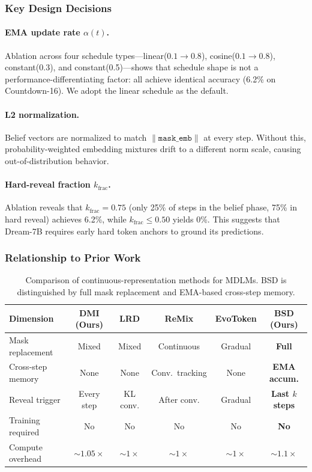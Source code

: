 \documentclass{article}
\begin{document}
\subsubsection{Key Design Decisions}

\paragraph{EMA update rate $\alpha(t)$.} Ablation across four schedule types---linear($0.1{\to}0.8$), cosine($0.1{\to}0.8$), constant(0.3), and constant(0.5)---shows that schedule shape is not a performance-differentiating factor: all achieve identical accuracy (6.2\% on Countdown-16). We adopt the linear schedule as the default.

\paragraph{L2 normalization.} Belief vectors are normalized to match $\|\texttt{mask\_emb}\|$ at every step. Without this, probability-weighted embedding mixtures drift to a different norm scale, causing out-of-distribution behavior.

\paragraph{Hard-reveal fraction $k_\text{frac}$.} Ablation reveals that $k_\text{frac} = 0.75$ (only 25\% of steps in the belief phase, 75\% in hard reveal) achieves 6.2\%, while $k_\text{frac} \leq 0.50$ yields 0\%. This suggests that Dream-7B requires early hard token anchors to ground its predictions.

\subsubsection{Relationship to Prior Work}

\begin{table}[t]
\caption{Comparison of continuous-representation methods for MDLMs. BSD is distinguished by full mask replacement and EMA-based cross-step memory.}
\label{tab:method_comparison}
\centering
\small
\begin{tabular}{lccccc}
\toprule
Dimension & DMI (Ours) & LRD & ReMix & EvoToken & \textbf{BSD (Ours)} \\
\midrule
Mask replacement & Mixed & Mixed & Continuous & Gradual & \textbf{Full} \\
Cross-step memory & None & None & Conv.\ tracking & None & \textbf{EMA accum.} \\
Reveal trigger & Every step & KL conv. & After conv. & Gradual & \textbf{Last $k$ steps} \\
Training required & No & No & No & No & \textbf{No} \\
Compute overhead & ${\sim}1.05{\times}$ & ${\sim}1{\times}$ & ${\sim}1{\times}$ & ${\sim}1{\times}$ & ${\sim}1.1{\times}$ \\
\bottomrule
\end{tabular}
\end{table}
\end{document}
